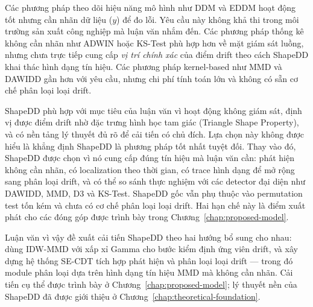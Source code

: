 Các phương pháp theo dõi hiệu năng mô hình như DDM và EDDM hoạt động tốt nhưng cần nhãn dữ liệu ($y$) để đo lỗi. Yêu cầu này không khả thi trong môi trường sản xuất công nghiệp mà luận văn nhắm đến. Các phương pháp thống kê không cần nhãn như ADWIN hoặc KS-Test phù hợp hơn về mặt giám sát luồng, nhưng chưa trực tiếp cung cấp \textit{vị trí chính xác} của điểm drift theo cách ShapeDD khai thác hình dạng tín hiệu. Các phương pháp kernel-based như MMD và DAWIDD gần hơn với yêu cầu, nhưng chi phí tính toán lớn và không có sẵn cơ chế phân loại loại drift.

ShapeDD phù hợp với mục tiêu của luận văn vì hoạt động không giám sát, định vị được điểm drift nhờ đặc trưng hình học tam giác (Triangle Shape Property), và có nền tảng lý thuyết đủ rõ để cải tiến có chủ đích. Lựa chọn này không được hiểu là khẳng định ShapeDD là phương pháp tốt nhất tuyệt đối. Thay vào đó, ShapeDD được chọn vì nó cung cấp đúng tín hiệu mà luận văn cần: phát hiện không cần nhãn, có localization theo thời gian, có trace hình dạng để mở rộng sang phân loại drift, và có thể so sánh thực nghiệm với các detector đại diện như DAWIDD, MMD, D3 và KS-Test. ShapeDD gốc vẫn phụ thuộc vào permutation test tốn kém và chưa có cơ chế phân loại loại drift. Hai hạn chế này là điểm xuất phát cho các đóng góp được trình bày trong Chương~\ref{chap:proposed-model}.

Luận văn vì vậy đề xuất cải tiến ShapeDD theo hai hướng bổ sung cho nhau: dùng IDW-MMD với xấp xỉ Gamma cho bước kiểm định ứng viên drift, và xây dựng hệ thống SE-CDT tích hợp phát hiện và phân loại loại drift --- trong đó module phân loại dựa trên hình dạng tín hiệu MMD mà không cần nhãn. Cải tiến cụ thể được trình bày ở Chương~\ref{chap:proposed-model}; lý thuyết nền của ShapeDD đã được giới thiệu ở Chương~\ref{chap:theoretical-foundation}.
